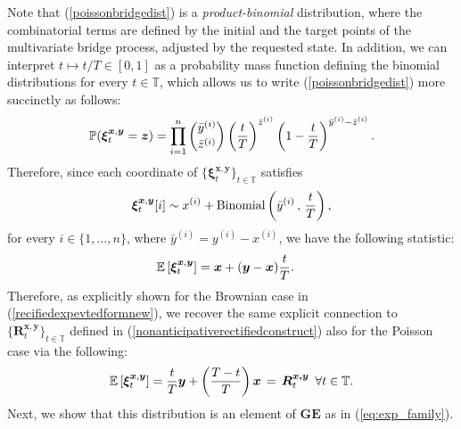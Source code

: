 \documentclass{article}
\def\E{\mathbb{E}}
\def\T{\mathbb{T}}
\def\xib{\boldsymbol{\xi}}
\theoremstyle{definition}
\begin{document}
Note that (\ref{poissonbridgedist}) is a \emph{product-binomial} distribution, where the combinatorial terms are defined by the initial and the target points of the multivariate bridge process, adjusted by the requested state. In addition, we can interpret $t \mapsto t/T \in [0,1]$ as a probability mass function defining the binomial distributions for every $t\in\T$, which allows us to write (\ref{poissonbridgedist}) more succinctly as follows:
\begin{align}
\mathbb{P}(\xib^{\boldsymbol{x},\boldsymbol{y}}_t = \boldsymbol{z}) = \prod_{i=1}^n {{\bar{y}^{(i)}}\choose{\bar{z}^{(i)}}}  \left(\frac{t}{T}\right)^{\bar{z}^{(i)}}\left(1 - \frac{t}{T}\right)^{\bar{y}^{(i)} - \bar{z}^{(i)}}. \notag
\end{align}
Therefore, since each coordinate of $\{\xib^{\boldsymbol{x},\boldsymbol{y}}_t \}_{t\in\T}$ satisfies
\begin{align}
\xib^{\boldsymbol{x},\boldsymbol{y}}_t[i] \sim x^{(i)} + \text{Binomial}\left(\bar{y}^{(i)} \, , \, \frac{t}{T}\right), \notag
\end{align}
for every $i \in \{1,\ldots, n\}$, where $\bar{y}^{(i)} = y^{(i)} - x^{(i)}$, we have the following statistic:
\begin{align}
\E\left[ \xib^{\boldsymbol{x},\boldsymbol{y}}_t \right] &= \boldsymbol{x} + (\boldsymbol{y} - \boldsymbol{x})\frac{t}{T}. \notag 
\end{align}
Therefore, as explicitly shown for the Brownian case in (\ref{recifiedexpevtedformnew}), we recover the same explicit connection to $\{\boldsymbol{R}^{\boldsymbol{x,y}}_t\}_{t\in\mathbb{T}}$ defined in (\ref{nonanticipativerectifiedconstruct}) also for the Poisson case via the following:   
\begin{equation}
        \E\left[\boldsymbol{\xi}^{\boldsymbol{x},\boldsymbol{y}}_t\right] = \frac{t}{T}\boldsymbol{y} + \left(\frac{T-t}{T}\right)\boldsymbol{x} \, = \, \boldsymbol{R}^{\boldsymbol{x,y}}_t \,\,\, \forall t\in\T. \notag
    \end{equation}
Next, we show that this distribution is an element of $\textbf{GE}$ as in (\ref{eq:exp_family}).
\end{document}
